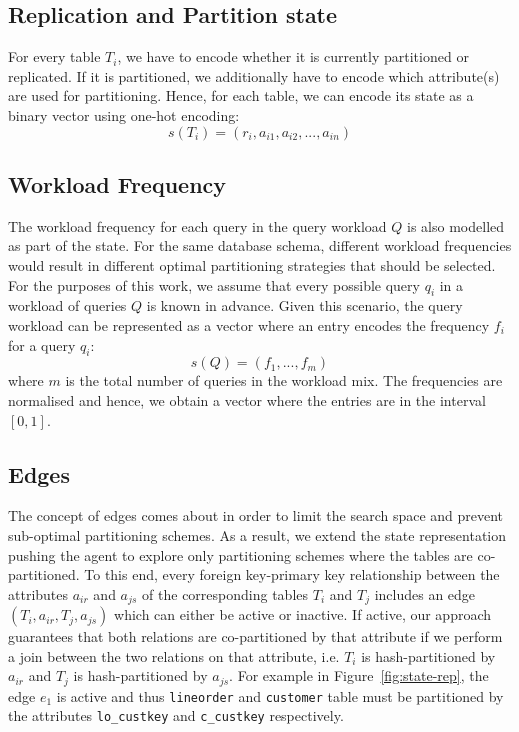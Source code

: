 \subsection{Replication and Partition state}
For every table $T_i$, we have to encode whether it is currently partitioned or replicated. If it is partitioned, we additionally have to encode which attribute(s) are used for partitioning. Hence, for each table, we can encode its state as a binary vector using one-hot encoding:
\begin{equation}
    s(T_i) = (r_i, a_{i1},a_{i2},...,a_{in})
\end{equation}

\subsection{Workload Frequency}
The workload frequency for each query in the query workload $Q$ is also modelled as part of the state. For the same database schema, different workload frequencies would result in different optimal partitioning strategies that should be selected. For the purposes of this work, we assume that every possible query $q_i$ in a workload of queries $Q$ is known in advance. Given this scenario, the query workload can be represented as a vector where an entry encodes the frequency $f_i$ for a query $q_i$:
\begin{equation}
    s(Q) = (f_1,...,f_m)
\end{equation}
where $m$ is the total number of queries in the workload mix. The frequencies are normalised and hence, we obtain a vector where the entries are in the interval $[0,1]$. 

\subsection{Edges}
The concept of edges comes about in order to limit the search space and prevent sub-optimal partitioning schemes. As a result, we extend the state representation pushing the agent to explore only partitioning schemes where the tables are co-partitioned. To this end, every foreign key-primary key relationship between the attributes $a_{ir}$ and $a_{js}$ of the corresponding tables $T_i$ and $T_j$ includes an edge $(T_i,a_{ir},T_j,a_{js})$ which can either be active or inactive. If active, our approach guarantees that both relations are co-partitioned by that attribute if we perform a join between the two relations on that attribute, i.e. $T_i$ is hash-partitioned by $a_{ir}$ and $T_j$ is hash-partitioned by $a_{js}$. For example in Figure~\ref{fig:state-rep}, the edge $e_1$ is active and thus \texttt{lineorder} and \texttt{customer} table must be partitioned by the attributes \texttt{lo\_custkey} and \texttt{c\_custkey} respectively.



